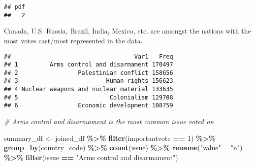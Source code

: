 \documentclass[
]{article}
\newenvironment{Shaded}{\begin{snugshade}}{\end{snugshade}}
\newcommand{\CommentTok}[1]{\textcolor[rgb]{0.56,0.35,0.01}{\textit{#1}}}
\newcommand{\DecValTok}[1]{\textcolor[rgb]{0.00,0.00,0.81}{#1}}
\newcommand{\KeywordTok}[1]{\textcolor[rgb]{0.13,0.29,0.53}{\textbf{#1}}}
\newcommand{\NormalTok}[1]{#1}
\newcommand{\OperatorTok}[1]{\textcolor[rgb]{0.81,0.36,0.00}{\textbf{#1}}}
\newcommand{\StringTok}[1]{\textcolor[rgb]{0.31,0.60,0.02}{#1}}
\begin{document}
\begin{verbatim}
## pdf 
##   2
\end{verbatim}

Canada, U.S. Russia, Brazil, India, Mexico, etc. are amongst the nations
with the most votes cast/most represented in the data.

\begin{Shaded}
\end{Shaded}

\begin{verbatim}
##                                   Var1   Freq
## 1         Arms control and disarmament 170497
## 2                 Palestinian conflict 158656
## 3                         Human rights 156623
## 4 Nuclear weapons and nuclear material 133635
## 5                          Colonialism 129708
## 6                 Economic development 108759
\end{verbatim}

\begin{Shaded}
\begin{Highlighting}[]
\CommentTok{\# Arms control and disarmament is the most common issue voted on }

\NormalTok{summary\_df \textless{}{-}}\StringTok{ }\NormalTok{joined\_df }\OperatorTok{\%\textgreater{}\%}
\StringTok{  }\KeywordTok{filter}\NormalTok{(importantvote }\OperatorTok{==}\StringTok{ }\DecValTok{1}\NormalTok{) }\OperatorTok{\%\textgreater{}\%}
\StringTok{  }\KeywordTok{group\_by}\NormalTok{(country\_code) }\OperatorTok{\%\textgreater{}\%}
\StringTok{  }\KeywordTok{count}\NormalTok{(issue) }\OperatorTok{\%\textgreater{}\%}
\StringTok{  }\KeywordTok{rename}\NormalTok{(}\StringTok{"value"}\NormalTok{ =}\StringTok{ "n"}\NormalTok{) }\OperatorTok{\%\textgreater{}\%}
\StringTok{  }\KeywordTok{filter}\NormalTok{(issue }\OperatorTok{==}\StringTok{ "Arms control and disarmament"}\NormalTok{)}
\end{Highlighting}
\end{Shaded}
\end{document}
